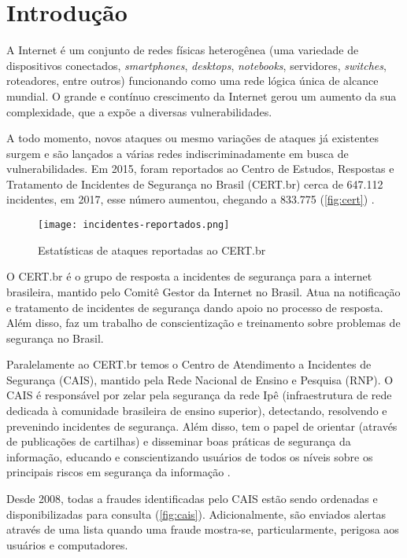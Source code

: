 \chapter{Introdução} \label{ch:introdução}

A Internet é um conjunto de redes físicas heterogênea (uma variedade de dispositivos conectados, \textit{smartphones}, \textit{desktops}, \textit{notebooks}, servidores, \textit{switches}, roteadores, entre outros) funcionando como uma rede lógica única de alcance mundial. O grande e contínuo crescimento da Internet gerou um aumento da sua complexidade, que a expõe a diversas vulnerabilidades. 

A todo momento, novos ataques ou mesmo variações de ataques já existentes surgem e são lançados a várias redes indiscriminadamente em busca de vulnerabilidades. Em 2015, foram reportados ao Centro de Estudos, Respostas e Tratamento de Incidentes de Segurança no Brasil (CERT.br) cerca de 647.112 incidentes, em 2017, esse número aumentou, chegando a 833.775 (\autoref{fig:cert}) \cite{estatistica:cert.br}.

\begin{figure}[!htb]
 \centering
 \caption{Estatísticas de ataques reportadas ao CERT.br}
 \texttt{[image: incidentes-reportados.png]}
 \label{fig:cert}
\end{figure}

O CERT.br é o grupo de resposta a incidentes de segurança para a internet brasileira, mantido pelo Comitê Gestor da Internet no Brasil. Atua na notificação e tratamento de incidentes de segurança dando apoio no processo de resposta. Além disso, faz um trabalho de conscientização e treinamento sobre problemas de segurança no Brasil.

Paralelamente ao CERT.br temos o Centro de Atendimento a Incidentes de Segurança (CAIS), mantido pela Rede Nacional de Ensino e Pesquisa (RNP). O CAIS é responsável por zelar pela segurança da rede Ipê (infraestrutura de rede dedicada à comunidade brasileira de ensino superior), detectando, resolvendo e prevenindo incidentes de segurança. Além disso, tem o papel de orientar (através de publicações de cartilhas) e disseminar boas práticas de segurança da informação, educando e conscientizando usuários de todos os níveis sobre os principais riscos em segurança da informação \cite{cais}.

Desde 2008, todas a fraudes identificadas pelo CAIS estão sendo ordenadas e disponibilizadas para consulta (\autoref{fig:cais}). Adicionalmente, são enviados alertas através de uma lista quando uma fraude mostra-se, particularmente, perigosa aos usuários e computadores.

